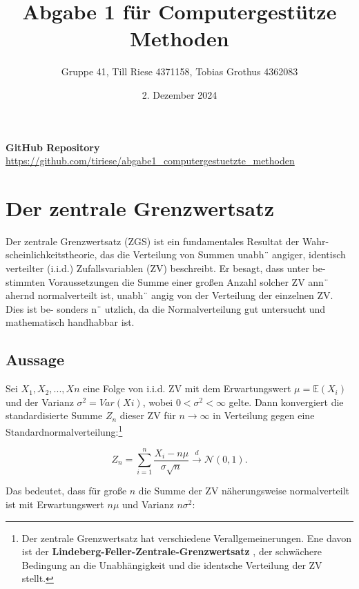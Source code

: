 \documentclass{article}
\title{Abgabe 1 für Computergestütze Methoden}
\author{Gruppe 41, Till Riese 4371158, Tobias Grothus 4362083}
\date{2. Dezember 2024}
\begin{document}
\maketitle

\tableofcontents 


\begin{center}
\vspace{8cm}
\textbf{GitHub Repository} \\ 
\url{https://github.com/tiriese/abgabe1_computergestuetzte_methoden}

\end{center}
 
\newpage



\section{Der zentrale Grenzwertsatz }
Der zentrale Grenzwertsatz (ZGS) ist ein fundamentales Resultat der Wahr-
scheinlichkeitstheorie, das die Verteilung von Summen unabh¨ angiger, identisch
verteilter (i.i.d.) Zufallsvariablen (ZV) beschreibt. Er besagt, dass unter be-
stimmten Voraussetzungen die Summe einer großen Anzahl solcher ZV ann¨ ahernd
normalverteilt ist, unabh¨ angig von der Verteilung der einzelnen ZV. Dies ist be-
sonders n¨ utzlich, da die Normalverteilung gut untersucht und mathematisch
handhabbar ist.

\subsection{Aussage}

Sei $X_1, X_2, . . . , Xn$ eine Folge von i.i.d. ZV mit dem Erwartungswert $\mu=\mathbb{E}(X_i)$ und der Varianz $\sigma ^2 = Var(Xi)$, wobei $0 < \sigma ^2 < \infty$ gelte. Dann konvergiert die standardisierte Summe $Z_n$ dieser ZV für ${n \to \infty}$ in Verteilung gegen eine Standardnormalverteilung:\footnote{Der zentrale Grenzwertsatz hat verschiedene Verallgemeinerungen. Ene davon ist der \textbf{Lindeberg-Feller-Zentrale-Grenzwertsatz}
\cite[Seite 328]{Wahrscheinlichkeitstheorie}, der schwächere Bedingung an die Unabhängigkeit und die identsche Verteilung der ZV stellt. }


\begin{equation}
    Z_n= \sum_{i = 1}^n \frac{X_i - n\mu}{\sigma\sqrt{n}}\xrightarrow{d} \mathcal{N}(0,1). \label{eq:1}
\end{equation} 

Das bedeutet, dass für große $n$ die Summe der ZV näherungsweise normalverteilt ist mit Erwartungswert $n\mu$ und Varianz $n\sigma^2$:
\end{document}
